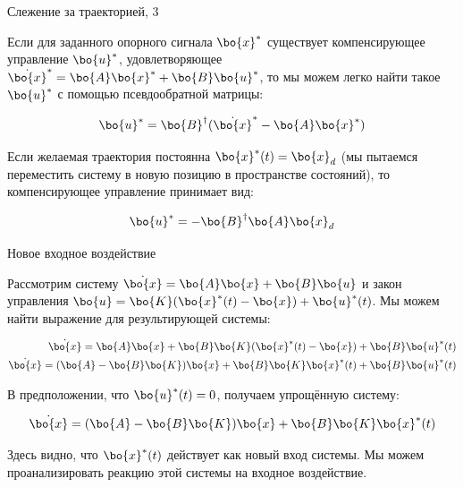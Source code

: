 \documentclass{beamer}
\begin{document}
\begin{frame}{Слежение за траекторией, 3}
	\begin{flushleft}
		
		Если для заданного опорного сигнала $\bo{x}^*$ существует компенсирующее управление $\bo{u}^*$, удовлетворяющее $\dot{\bo{x}}^* = \bo{A}\bo{x}^* + \bo{B}\bo{u}^*$, то мы можем легко найти такое $\bo{u}^*$ с помощью псевдообратной матрицы:
		
		\begin{equation}
			\bo{u}^* = \bo{B}^\dagger(\dot{\bo{x}}^*  - \bo{A}\bo{x}^*)
		\end{equation}				
		
		Если желаемая траектория постоянна $\bo{x}^*(t) = \bo{x}_d$ (мы пытаемся переместить систему в новую позицию в пространстве состояний), то компенсирующее управление принимает вид:
		
		\begin{equation}
			\bo{u}^* = -\bo{B}^\dagger\bo{A}\bo{x}_d
		\end{equation}	
		
		
	\end{flushleft}
\end{frame}



\begin{frame}{Новое входное воздействие}
	\begin{flushleft}
		
		Рассмотрим систему $\dot{\bo{x}} = \bo{A}\bo{x} + \bo{B}\bo{u}$ и закон управления $\bo{u} = \bo{K}(\bo{x}^*(t) - \bo{x}) + \bo{u}^*(t)$. Мы можем найти выражение для результирующей системы:
		
		\begin{align}
			\dot{\bo{x}} = \bo{A}\bo{x} + \bo{B}\bo{K}(\bo{x}^*(t) - \bo{x}) + \bo{B}\bo{u}^*(t) \\
			\dot{\bo{x}} = (\bo{A}- \bo{B}\bo{K})\bo{x} +\bo{B}\bo{K}\bo{x}^*(t) + \bo{B}\bo{u}^*(t)
		\end{align}		
		
		В предположении, что $\bo{u}^*(t) = 0$, получаем упрощённую систему:
		
		\begin{align}
			\dot{\bo{x}} =  (\bo{A}- \bo{B}\bo{K})\bo{x} +\bo{B}\bo{K}\bo{x}^*(t)
		\end{align}				
		
		Здесь видно, что $\bo{x}^*(t)$ действует как новый вход системы. Мы можем проанализировать реакцию этой системы на входное воздействие.
		
	\end{flushleft}
\end{frame}
\end{document}
